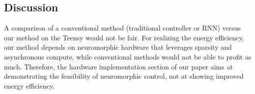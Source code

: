\subsection*{Discussion}

A comparison of a conventional method (traditional controller or RNN) versus our method on the Teensy would not be fair. For realizing the energy efficiency, our method depends on neuromorphic hardware that leverages sparsity and asynchronous compute, while conventional methods would not be able to profit as much. Therefore, the hardware implementation section of our paper aims at demonstrating the feasibility of neuromorphic control, not at showing improved energy efficiency.
